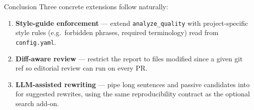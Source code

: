 \documentclass[
  ignorenonframetext,
]{beamer}
\providecommand{\tightlist}{%
  \setlength{\itemsep}{0pt}\setlength{\parskip}{0pt}}
\begin{document}
\begin{frame}{Conclusion}
Three concrete extensions follow naturally:

\begin{enumerate}
\tightlist
\item
  \textbf{Style-guide enforcement} --- extend \texttt{analyze\_quality}
  with project-specific style rules (e.g.~forbidden phrases, required
  terminology) read from \texttt{config.yaml}.
\item
  \textbf{Diff-aware review} --- restrict the report to files modified
  since a given git ref so editorial review can run on every PR.
\item
  \textbf{LLM-assisted rewriting} --- pipe long sentences and passive
  candidates into  for suggested rewrites,
  using the same  reproducibility
  contract as the optional search add-on.
\end{enumerate}
\end{frame}
\end{document}
